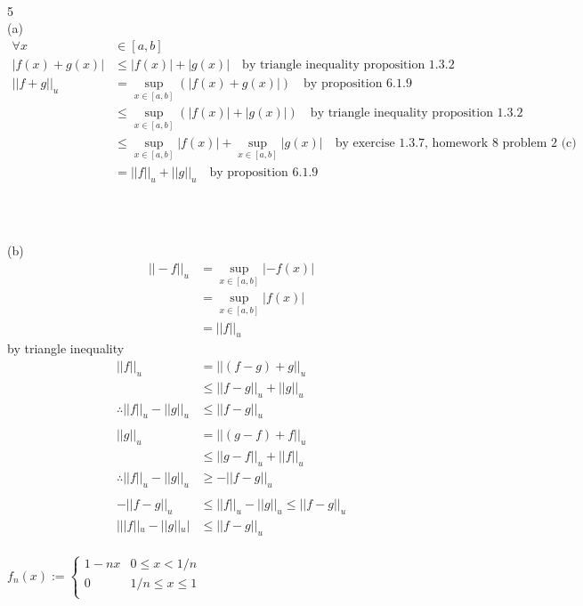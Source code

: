 \documentclass[12pt, border = 4pt, multi]{article} %
\begin{document}
\\
\\
\\
5\\
(a)
\begin{align*}
\forall x &\in [a, b]\\
|f(x) + g(x)| &\leq |f(x)| + |g(x)| \quad \text{by triangle inequality proposition 1.3.2}\\
||f + g||_u &= \sup_{x \in [a, b]}(|f(x) + g(x)|)\quad \text{by proposition 6.1.9}\\
&\leq \sup_{x \in [a, b]}(|f(x)| + |g(x)|)\quad \text{by triangle inequality proposition 1.3.2}\\
&\leq \sup_{x \in [a, b]}|f(x)| + \sup_{x \in [a, b]}|g(x)| \quad \text{by exercise 1.3.7, homework 8 problem 2 (c)}\\
&= ||f||_u + ||g||_u\quad \text{by proposition 6.1.9}\\
\end{align*}
\\
\\
\\
(b)
\begin{align*}
||-f||_u &= \sup_{x \in [a, b]} |-f(x)|\\
&= \sup_{x \in [a, b]} |f(x)|\\
&= ||f||_u
\end{align*}
by triangle inequality
\begin{align*}
||f||_u &= ||(f - g) + g||_u\\
&\leq ||f - g||_u + ||g||_u\\
\therefore ||f||_u - ||g||_u &\leq ||f - g||_u\\
\\
||g||_u &= ||(g - f) + f||_u\\
&\leq ||g - f||_u + ||f||_u\\
\therefore ||f||_u - ||g||_u &\geq -||f - g||_u\\
\\
-||f - g||_u &\leq ||f||_u - ||g||_u \leq ||f - g||_u\\
|||f||_u - ||g||_u| &\leq ||f - g||_u
\end{align*}
\newpage
{}\\
$f_n(x) :=
\begin{cases}
1 - nx & 0 \leq x < 1 / n\\
0 & 1 / n \leq x \leq 1\\
\end{cases}$\\
\\
\end{document}
